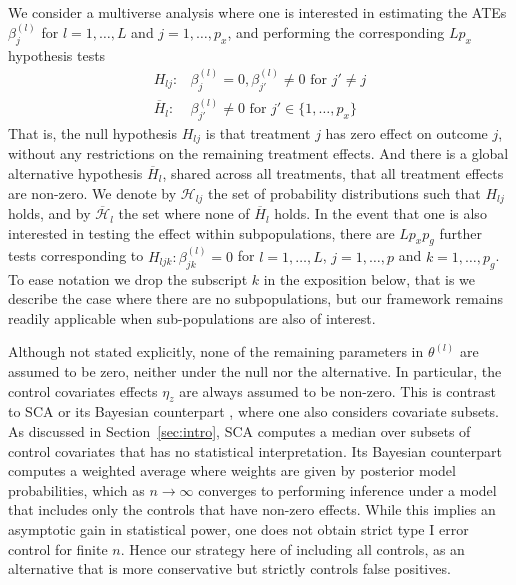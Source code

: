 \documentclass[pdflatex,sn-mathphys-num]{sn-jnl}%
\theoremstyle{thmstyleone}%
\theoremstyle{thmstyletwo}%
\theoremstyle{thmstylethree}%
\begin{document}
We consider a multiverse analysis where one is interested in estimating the ATEs $\beta_j^{(l)}$ for $l=1,\ldots,L$ and $j=1,\ldots,p_x$,
and performing the corresponding $L p_x$ hypothesis tests
\begin{align}\label{eq:test}
H_{lj}: &\beta_j^{(l)}= 0, \beta_{j'}^{(l)} \neq 0 \mbox{ for } j' \neq j
\nonumber
\\
\overline{H}_l: & \beta_{j'}^{(l)} \neq 0 \mbox{ for } j' \in \{1,\ldots,p_x\}
\end{align}
That is, the null hypothesis $H_{lj}$ is that treatment $j$ has zero effect on outcome $j$, without any restrictions on the remaining treatment effects.
And there is a global alternative hypothesis $\overline{H}_l$, shared across all treatments, that all treatment effects are non-zero.
We denote by $\mathcal{H}_{lj}$ the set of probability distributions such that $H_{lj}$ holds, and by $\overline{\mathcal{H}}_l$ the set where none of $\overline{H}_l$ holds.
In the event that one is also interested in testing the effect within subpopulations, there are $L p_x p_g$ further tests corresponding to $H_{ljk}: \beta_{jk}^{(l)}=0$ for  $l=1,\ldots,L$, $j=1,\ldots,p$ and $k=1,\ldots,p_g$.
To ease notation we drop the subscript $k$ in the exposition below, that is we describe the case where there are no subpopulations, but our framework remains readily applicable when sub-populations are also of interest.

Although not stated explicitly, none of the remaining parameters in $\theta^{(l)}$ are assumed to be zero, neither under the null nor the alternative.
In particular, the control covariates effects $\eta_z$ are always assumed to be non-zero.
This is contrast to SCA \citep{simonsohn:2020} or its Bayesian counterpart \citep{semken:2022}, where one also considers covariate subsets.
As discussed in Section~\ref{sec:intro}, SCA computes a median over subsets of control covariates that has no statistical interpretation. Its Bayesian counterpart computes a weighted average where weights are given by posterior model probabilities, which as $n \to \infty$ converges to performing inference under a model that includes only the controls that have non-zero effects.
While this implies an asymptotic gain in statistical power, one does not obtain strict type I error control for finite $n$.
Hence our strategy here of including all controls, as an alternative that is more conservative but strictly controls false positives.
\end{document}
